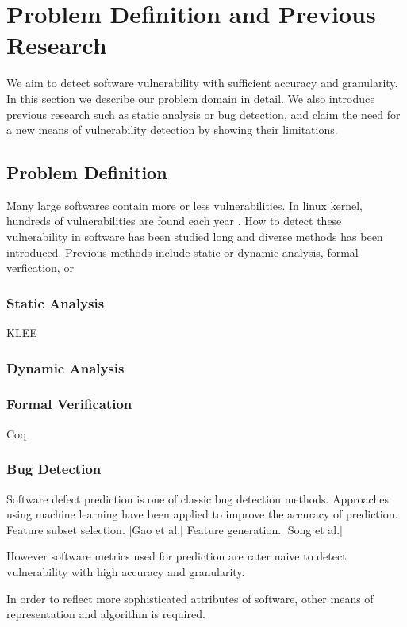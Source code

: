 \section{Problem Definition and Previous Research}
We aim to detect software vulnerability with sufficient accuracy and granularity.
In this section we describe our problem domain in detail.
We also introduce previous research such as static analysis or bug detection,
and claim the need for a new means of vulnerability detection by showing their limitations.


\subsection{Problem Definition}

Many large softwares contain more or less vulnerabilities. In linux kernel, hundreds of vulnerabilities are found each year \cite{cvelinux}.
How to detect these vulnerability in software has been studied long and diverse methods has been introduced.
Previous methods include static or dynamic analysis, formal verfication, or 

\subsubsection{Static Analysis}

KLEE

\subsubsection{Dynamic Analysis}

\subsubsection{Formal Verification}

Coq

\subsubsection{Bug Detection}

Software defect prediction is one of classic bug detection methods.
Approaches using machine learning have been applied to improve the accuracy of prediction.
Feature subset selection. [Gao et al.]
Feature generation. [Song et al.]


However software metrics used for prediction are rater naive to detect vulnerability
with high accuracy and granularity.

In order to reflect more sophisticated attributes of software, other means of representation and algorithm is required.
